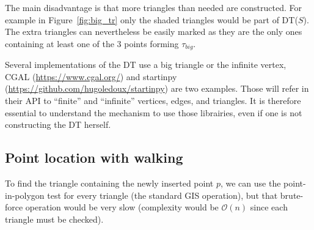 %

The main disadvantage is that more triangles than needed are constructed. 
For example in Figure~\ref{fig:big_tr} only the shaded triangles would be part of DT($S$). 
The extra triangles can nevertheless be easily marked as they are the only ones containing at least one of the 3 points forming $\tau_{big}$. 

%

\begin{floatbox}
  \begin{kaobox-practice}[frametitle=\faCog\ How are DT created in practice?]
  Several implementations of the DT use a big triangle or the infinite vertex,  CGAL (\url{https://www.cgal.org/}) and startinpy (\url{https://github.com/hugoledoux/startinpy}) are two examples.
  Those will refer in their API to ``finite'' and ``infinite'' vertices, edges, and triangles.
  It is therefore essential to understand the mechanism to use those librairies, even if one is not constructing the DT herself.
  \end{kaobox-practice}
\end{floatbox}


\subsection{Point location with walking}%
\label{sec:dtwalk}

To find the triangle containing the newly inserted point $p$, we can use the point-in-polygon test for every triangle (the standard GIS operation), but that brute-force operation would be very slow (complexity would be $\mathcal{O}(n)$ since each triangle must be checked).


